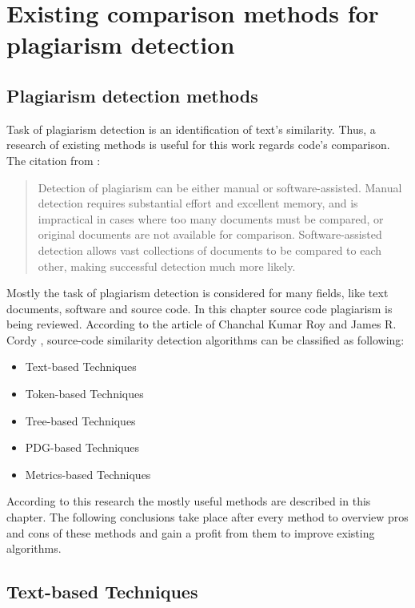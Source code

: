 \documentclass{report}
\begin{document}
\chapter{Existing comparison methods for plagiarism detection}
\label{cha:methods}
\section{Plagiarism detection methods}
\label{sec: plagiarism_methods}

Task of plagiarism detection is an identification of text's similarity. Thus, a research of existing methods is useful for this work regards code's comparison.
The citation from \cite{software_clone_detection}:
\begin{quote} Detection of plagiarism can be either manual or software-assisted. Manual detection requires substantial effort and excellent memory, and is impractical in cases where too many documents must be compared, or original documents are not available for comparison. Software-assisted detection allows vast collections of documents to be compared to each other, making successful detection much more likely.\end{quote}

\noindent
Mostly the task of plagiarism detection is considered for many fields, like text documents, software and source code. In this chapter source code plagiarism is being reviewed.
According to the article of Chanchal Kumar Roy and James R. Cordy \cite{software_clone_detection}, source-code similarity detection algorithms can be classified as following:
\begin{itemize}
	\item Text-based Techniques
	\item Token-based Techniques
	\item Tree-based Techniques
	\item PDG-based Techniques
	\item Metrics-based Techniques
\end{itemize}
According to this research the mostly useful methods are described in this chapter. The following conclusions take place after every method to overview pros and cons of these methods and gain a profit from them to improve existing algorithms. 

\section{Text-based Techniques}
\label{sec: text_tech}
\end{document}
